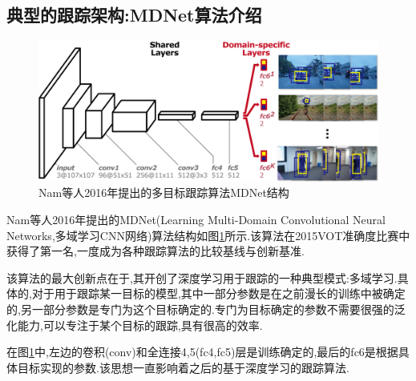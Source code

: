 \subsection{典型的跟踪架构:MDNet算法介绍}
\par
\begin{figure}[htbp!]
    \centering
    \includegraphics[width = 1.\textwidth]{chap/img/mdnet_.png}
    \caption{Nam等人2016年提出的多目标跟踪算法MDNet结构\supercite{nam2016mdnet}}
    \label{fig:mdnet_arch}
\end{figure}
\par
Nam等人2016年提出的MDNet(Learning Multi-Domain Convolutional Neural Networks,多域学习CNN网络)算法结构如图\ref{fig:mdnet_arch}所示.该算法在2015VOT准确度比赛中获得了第一名,一度成为各种跟踪算法的比较基线与创新基准.
\par
该算法的最大创新点在于,其开创了深度学习用于跟踪的一种典型模式:多域学习.具体的,对于用于跟踪某一目标的模型,其中一部分参数是在之前漫长的训练中被确定的,另一部分参数是专门为这个目标确定的.专门为目标确定的参数不需要很强的泛化能力,可以专注于某个目标的跟踪,具有很高的效率.
\par
在图\ref{fig:mdnet_arch}中,左边的卷积(conv)和全连接4,5(fc4,fc5)层是训练确定的,最后的fc6是根据具体目标实现的参数.该思想一直影响着之后的基于深度学习的跟踪算法.
\par

